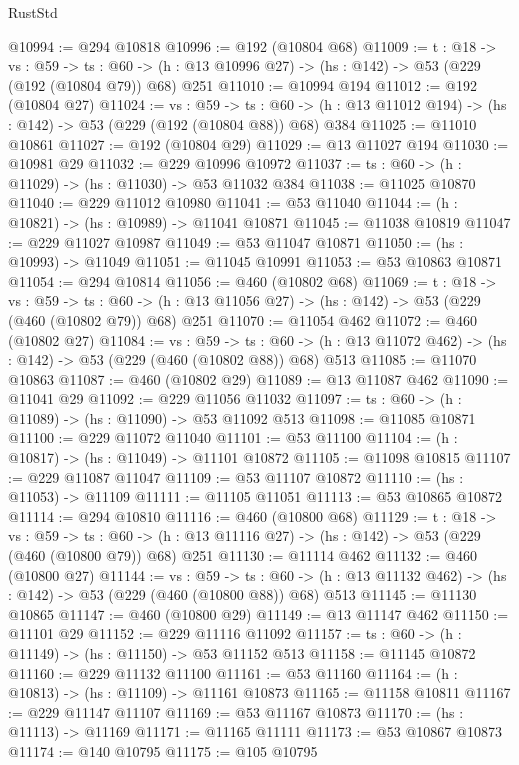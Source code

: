 \begin{lexlean}{RustStd}
\begin{coremodule}
@10994 := @294 @10818
@10996 := @192 (@10804 @68)
@11009 := {t : @18} ->
  {vs : @59} ->
  {ts : @60} -> (h : @13 @10996 @27) -> (hs : @142) -> @53 (@229 (@192 (@10804 @79)) @68) @251
@11010 := @10994 @194
@11012 := @192 (@10804 @27)
@11024 := {vs : @59} ->
  {ts : @60} -> (h : @13 @11012 @194) -> (hs : @142) -> @53 (@229 (@192 (@10804 @88)) @68) @384
@11025 := @11010 @10861
@11027 := @192 (@10804 @29)
@11029 := @13 @11027 @194
@11030 := @10981 @29
@11032 := @229 @10996 @10972
@11037 := {ts : @60} -> (h : @11029) -> (hs : @11030) -> @53 @11032 @384
@11038 := @11025 @10870
@11040 := @229 @11012 @10980
@11041 := @53 @11040
@11044 := (h : @10821) -> (hs : @10989) -> @11041 @10871
@11045 := @11038 @10819
@11047 := @229 @11027 @10987
@11049 := @53 @11047 @10871
@11050 := (hs : @10993) -> @11049
@11051 := @11045 @10991
@11053 := @53 @10863 @10871
@11054 := @294 @10814
@11056 := @460 (@10802 @68)
@11069 := {t : @18} ->
  {vs : @59} ->
  {ts : @60} -> (h : @13 @11056 @27) -> (hs : @142) -> @53 (@229 (@460 (@10802 @79)) @68) @251
@11070 := @11054 @462
@11072 := @460 (@10802 @27)
@11084 := {vs : @59} ->
  {ts : @60} -> (h : @13 @11072 @462) -> (hs : @142) -> @53 (@229 (@460 (@10802 @88)) @68) @513
@11085 := @11070 @10863
@11087 := @460 (@10802 @29)
@11089 := @13 @11087 @462
@11090 := @11041 @29
@11092 := @229 @11056 @11032
@11097 := {ts : @60} -> (h : @11089) -> (hs : @11090) -> @53 @11092 @513
@11098 := @11085 @10871
@11100 := @229 @11072 @11040
@11101 := @53 @11100
@11104 := (h : @10817) -> (hs : @11049) -> @11101 @10872
@11105 := @11098 @10815
@11107 := @229 @11087 @11047
@11109 := @53 @11107 @10872
@11110 := (hs : @11053) -> @11109
@11111 := @11105 @11051
@11113 := @53 @10865 @10872
@11114 := @294 @10810
@11116 := @460 (@10800 @68)
@11129 := {t : @18} ->
  {vs : @59} ->
  {ts : @60} -> (h : @13 @11116 @27) -> (hs : @142) -> @53 (@229 (@460 (@10800 @79)) @68) @251
@11130 := @11114 @462
@11132 := @460 (@10800 @27)
@11144 := {vs : @59} ->
  {ts : @60} -> (h : @13 @11132 @462) -> (hs : @142) -> @53 (@229 (@460 (@10800 @88)) @68) @513
@11145 := @11130 @10865
@11147 := @460 (@10800 @29)
@11149 := @13 @11147 @462
@11150 := @11101 @29
@11152 := @229 @11116 @11092
@11157 := {ts : @60} -> (h : @11149) -> (hs : @11150) -> @53 @11152 @513
@11158 := @11145 @10872
@11160 := @229 @11132 @11100
@11161 := @53 @11160
@11164 := (h : @10813) -> (hs : @11109) -> @11161 @10873
@11165 := @11158 @10811
@11167 := @229 @11147 @11107
@11169 := @53 @11167 @10873
@11170 := (hs : @11113) -> @11169
@11171 := @11165 @11111
@11173 := @53 @10867 @10873
@11174 := @140 @10795
@11175 := @105 @10795

\end{coremodule}
\end{lexlean}
